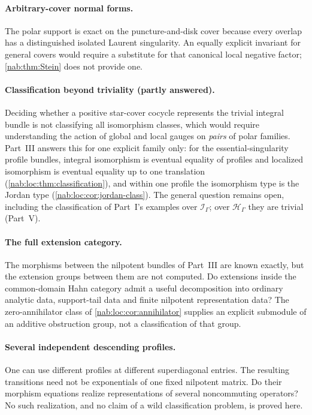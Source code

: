 \documentclass[11pt,letterpaper]{article}
\theoremstyle{definition}
\theoremstyle{remark}
\newcommand{\HH}{\mathscr H_\Gamma}
\newcommand{\II}{\mathscr I_\Gamma}
\numberwithin{equation}{section}
\begin{document}
\paragraph{Arbitrary-cover normal forms.}
The polar support is exact on the puncture-and-disk cover because every overlap
has a distinguished isolated Laurent singularity. An equally explicit invariant
for general covers would require a substitute for that canonical local negative
factor; \cref{nab:thm:Stein} does not provide one.

\paragraph{Classification beyond triviality (partly answered).}
Deciding whether a positive star-cover cocycle represents the trivial integral
bundle is not classifying all isomorphism classes, which would require
understanding the action of global and local gauges on \emph{pairs} of polar
families. Part~III answers this for one explicit family only: for the
essential-singularity profile bundles, integral isomorphism is eventual
equality of profiles and localized isomorphism is eventual equality up to one
translation (\cref{nab:loc:thm:classification}), and within one profile the
isomorphism type is the Jordan type (\cref{nab:loc:cor:jordan-class}). The
general question remains open, including the classification of Part~I's
examples over $\II$; over $\HH$ they are trivial (Part~V).

\paragraph{The full extension category.}
The morphisms between the nilpotent bundles of Part~III are known exactly, but
the extension groups between them are not computed. Do extensions inside the
common-domain Hahn category admit a useful decomposition into ordinary analytic
data, support-tail data and finite nilpotent representation data? The
zero-annihilator class of \cref{nab:loc:cor:annihilator} supplies an explicit
submodule of an additive obstruction group, not a classification of that
group.

\paragraph{Several independent descending profiles.}
One can use different profiles at different superdiagonal entries. The
resulting transitions need not be exponentials of one fixed nilpotent matrix.
Do their morphism equations realize representations of several noncommuting
operators? No such realization, and no claim of a wild classification problem,
is proved here.
\end{document}
